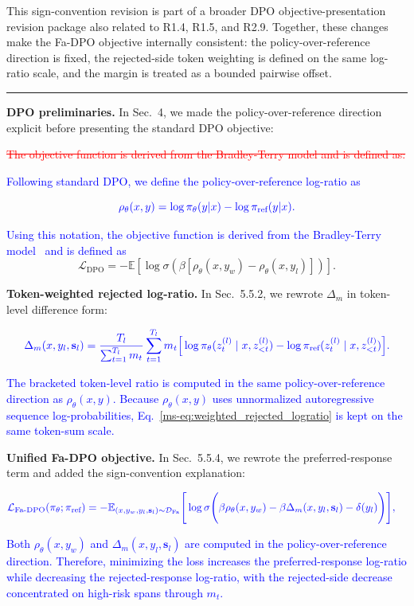 \documentclass[12pt]{article}
\newcommand{\deleted}[1]{\textcolor{red}{\sout{#1}}}
\newcommand{\added}[1]{\textcolor{blue}{#1}}
\newcommand{\responseheading}[1]{%
    \vspace{0.24cm}
    \par\noindent{\large\bfseries #1}\par
    \vspace{0.03cm}
    \noindent\rule{\linewidth}{0.35pt}\par
    \vspace{0.06cm}
    \noindent\ignorespaces
}
\begin{document}
This sign-convention revision is part of a broader DPO objective-presentation revision package also related to R1.4, R1.5, and R2.9. Together, these changes make the Fa-DPO objective internally consistent: the policy-over-reference direction is fixed, the rejected-side token weighting is defined on the same log-ratio scale, and the margin is treated as a bounded pairwise offset.


\responseheading{Revision Details}
\textbf{DPO preliminaries.}
In Sec.~4, we made the policy-over-reference direction explicit before presenting the
standard DPO objective:
\begin{displayquote}
\deleted{The objective function is derived from the Bradley-Terry model and is defined as:}

\added{Following standard DPO, we define the policy-over-reference log-ratio as}

\[
{\color{blue}
\rho_\theta(x,y)
=
\log \pi_\theta(y|x)
-
\log \pi_{\text{ref}}(y|x).
}
\]

\added{Using this notation, the objective function is derived from the Bradley-Terry model~\cite{bradley1952rank} and is defined as}
\[
\mathcal{L}_{\text{DPO}}
=
- \mathbb{E}\left[
\log \sigma\left(
\beta\left[\rho_\theta(x,y_w)-\rho_\theta(x,y_l)\right]
\right)
\right].
\]
\end{displayquote}

\textbf{Token-weighted rejected log-ratio.}
In Sec.~5.5.2, we rewrote $\Delta_m$ in token-level difference form:
\begin{displayquote}
\[
{\color{blue}
\Delta_m(x,y_l,\mathbf{s}_l)
=
\frac{T_l}{\sum_{t=1}^{T_l} m_t}
\sum_{t=1}^{T_l}
m_t
\Big[
\log \pi_\theta(z^{(l)}_t \mid x, z^{(l)}_{<t})
-
\log \pi_{\text{ref}}(z^{(l)}_t \mid x, z^{(l)}_{<t})
\Big].
}
\]

\added{The bracketed token-level ratio is computed in the same policy-over-reference direction as $\rho_\theta(x,y)$. Because $\rho_\theta(x,y)$ uses unnormalized autoregressive sequence log-probabilities, Eq.~\ref*{ms-eq:weighted_rejected_logratio} is kept on the same token-sum scale.}
\end{displayquote}

\textbf{Unified Fa-DPO objective.}
In Sec.~5.5.4, we rewrote the preferred-response term and added the sign-convention
explanation:
\begin{displayquote}
\[
{\color{blue}
\begin{split}
\mathcal{L}_{\text{Fa-DPO}}(\pi_\theta; \pi_{\text{ref}})
&= -\mathbb{E}_{(x, y_w, y_l, \mathbf{s}_l) \sim \mathcal{D}_{\text{Fa}}} \Bigg[
\log \sigma \Bigg(
\beta \rho_\theta(x,y_w)
- \beta \Delta_m(x,y_l,\mathbf{s}_l)
- \delta(y_l)
\Bigg) \Bigg],
\end{split}
}
\]

\added{Both $\rho_\theta(x,y_w)$ and $\Delta_m(x,y_l,\mathbf{s}_l)$ are computed in the policy-over-reference direction. Therefore, minimizing the loss increases the preferred-response log-ratio while decreasing the rejected-response log-ratio, with the rejected-side decrease concentrated on high-risk spans through $m_t$.}
\end{displayquote}
\end{document}
